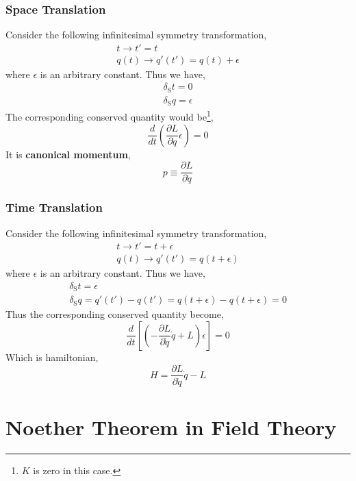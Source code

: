 \documentclass[12pt]{article}
\numberwithin{equation}{section}
\begin{document}
\subsubsection{Space Translation}
Consider the following infinitesimal symmetry transformation,
\begin{equation}
    \begin{split}
        t\rightarrow t' = t\\
        q(t)\rightarrow q'(t') = q(t) + \epsilon
    \end{split}
\end{equation}
where $\epsilon$ is an arbitrary constant.
Thus we have,
\begin{equation}
    \begin{split}
        \delta_{\text{S}}t =0\\
        \delta_{\text{S}}q = \epsilon
    \end{split}
\end{equation}
The corresponding conserved quantity would be\footnote{$K$ is zero in this case.},
\begin{equation}
    \frac{d}{dt}\left(\frac{\partial L}{\partial\dot{q}}\epsilon\right) = 0
\end{equation}
It is \textbf{canonical momentum},
\begin{equation}
    p\equiv\frac{\partial L}{\partial\dot{q}}
\end{equation}
\subsubsection{Time Translation}
Consider the following infinitesimal symmetry transformation,
\begin{equation}
    \begin{split}
        t\rightarrow t' = t+\epsilon\\
        q(t)\rightarrow q'(t') = q(t+\epsilon)
    \end{split}
\end{equation}
where $\epsilon$ is an arbitrary constant. Thus we have,
\begin{equation}
    \begin{split}
        \delta_{\text{S}}t = \epsilon\\
        \delta_{\text{S}}q = q'(t')-q(t') = q(t+\epsilon)-q(t+\epsilon) = 0
    \end{split}
\end{equation}
Thus the corresponding conserved quantity become,
\begin{equation}
    \frac{d}{dt}\left[\left(-\frac{\partial L}{\partial\dot{q}}\dot{q}+L\right)\epsilon\right] = 0
\end{equation}
Which is hamiltonian,
\begin{equation}
    H = \frac{\partial L}{\partial\dot{q}}\dot{q}-L
\end{equation}

\section{Noether Theorem in Field Theory}
\end{document}
